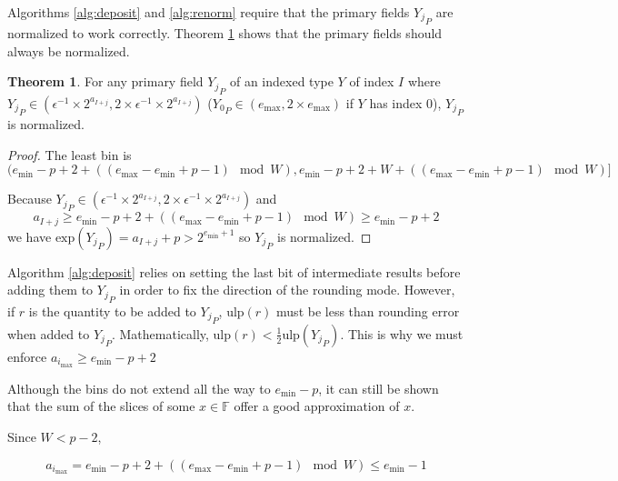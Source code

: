 \documentclass[12pt]{article}
\providecommand{\F}{\ensuremath{\mathbb{F}}}
\providecommand{\exp}{\ensuremath{\text{exp}}}
\providecommand{\min}{\ensuremath{\text{min}}}
\providecommand{\max}{\ensuremath{\text{max}}}
\providecommand{\ulp}{\ensuremath{\text{ulp}}}
\theoremstyle{definition}
\newtheorem{thm}{Theorem}[section]
\numberwithin{equation}{section}
\numberwithin{figure}{section}
\begin{document}
      Algorithms \ref{alg:deposit} and \ref{alg:renorm} require that the primary fields ${Y_j}_P$ are normalized to work correctly. Theorem \ref{thm:underflowufp} shows that the primary fields should always be normalized.

      \begin{samepage}
      \begin{thm}
        For any primary field ${Y_j}_P$ of an indexed type $Y$ of index $I$ where ${Y_j}_P \in (\epsilon^{-1} \times 2^{a_{I + j}}, 2 \times \epsilon^{-1} \times 2^{a_{I + j}})$ (${Y_0}_P \in (e_{\max}, 2 \times e_{\max})$ if $Y$ has index 0), ${Y_j}_P$ is normalized.
        \label{thm:underflowufp}
      \end{thm}
      \end{samepage}

      \begin{proof}
        The least bin is
        \begin{equation*}
        (e_{\min} - p + 2 + ((e_{\max} - e_{\min} + p - 1 ) \mod W), e_{\min} - p + 2 + W + ((e_{\max} - e_{\min} + p - 1)\mod W)]
        \end{equation*}

        Because ${Y_j}_P \in (\epsilon^{-1} \times 2^{a_{I + j}}, 2 \times \epsilon^{-1} \times 2^{a_{I + j}})$ and
        \begin{equation*}
        a_{I + j} \geq e_{\min} - p + 2 + ((e_{\max} - e_{\min} + p - 1) \mod W) \geq e_{\min} - p + 2
        \end{equation*}
        we have $\exp({Y_j}_P) = a_{I + j} + p > 2^{e_{\min} + 1}$ so ${Y_j}_P$ is normalized.
      \end{proof}

      Algorithm \ref{alg:deposit} relies on setting the last bit of intermediate results before adding them to ${Y_j}_P$ in order to fix the direction of the rounding mode. However, if $r$ is the quantity to be added to ${Y_j}_P$, $\ulp(r)$ must be less than rounding error when added to ${Y_j}_P$. Mathematically, $\ulp(r) < \frac{1}{2}\ulp({Y_j}_P)$. This is why we must enforce $a_{i_{\max}} \geq e_{\min} - p + 2$

      Although the bins do not extend all the way to $e_{\min} - p$, it can still be shown that the sum of the slices of some $x \in \F$ offer a good approximation of $x$.

      Since $W < p - 2$,

      \begin{equation*}
        a_{i_{\max}} = e_{\min} - p + 2 + ((e_{\max} - e_{\min} + p - 1 ) \mod W) \leq {e_{\min} - 1}
      \end{equation*}
\end{document}
